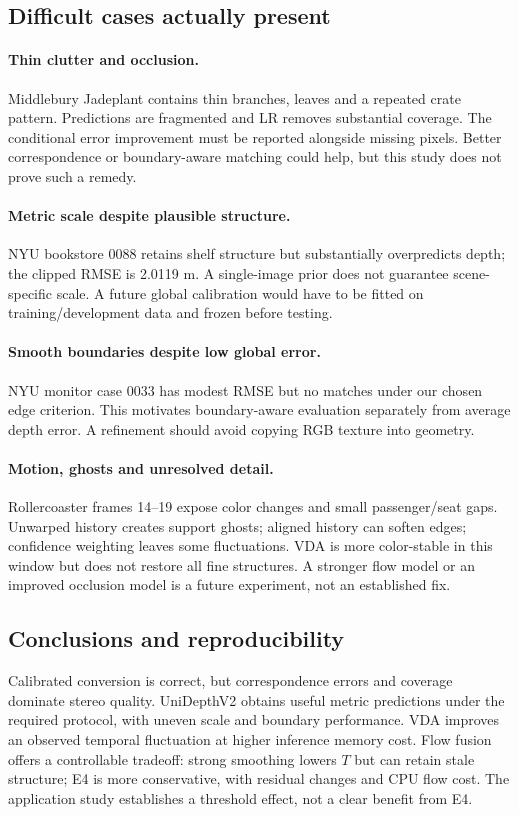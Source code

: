 \documentclass[10pt,twocolumn,letterpaper]{article}
\begin{document}
\subsection{Difficult cases actually present}
\paragraph{Thin clutter and occlusion.}
Middlebury Jadeplant contains thin branches, leaves and a repeated crate pattern. Predictions are fragmented and LR removes substantial coverage. The conditional error improvement must be reported alongside missing pixels. Better correspondence or boundary-aware matching could help, but this study does not prove such a remedy.

\paragraph{Metric scale despite plausible structure.}
NYU bookstore 0088 retains shelf structure but substantially overpredicts depth; the clipped RMSE is 2.0119 m. A single-image prior does not guarantee scene-specific scale. A future global calibration would have to be fitted on training/development data and frozen before testing.

\paragraph{Smooth boundaries despite low global error.}
NYU monitor case 0033 has modest RMSE but no matches under our chosen edge criterion. This motivates boundary-aware evaluation separately from average depth error. A refinement should avoid copying RGB texture into geometry.

\paragraph{Motion, ghosts and unresolved detail.}
Rollercoaster frames 14--19 expose color changes and small passenger/seat gaps. Unwarped history creates support ghosts; aligned history can soften edges; confidence weighting leaves some fluctuations. VDA is more color-stable in this window but does not restore all fine structures. A stronger flow model or an improved occlusion model is a future experiment, not an established fix.

\subsection{Conclusions and reproducibility}
Calibrated conversion is correct, but correspondence errors and coverage dominate stereo quality. UniDepthV2 obtains useful metric predictions under the required protocol, with uneven scale and boundary performance. VDA improves an observed temporal fluctuation at higher inference memory cost. Flow fusion offers a controllable tradeoff: strong smoothing lowers $T$ but can retain stale structure; E4 is more conservative, with residual changes and CPU flow cost. The application study establishes a threshold effect, not a clear benefit from E4.
\end{document}
